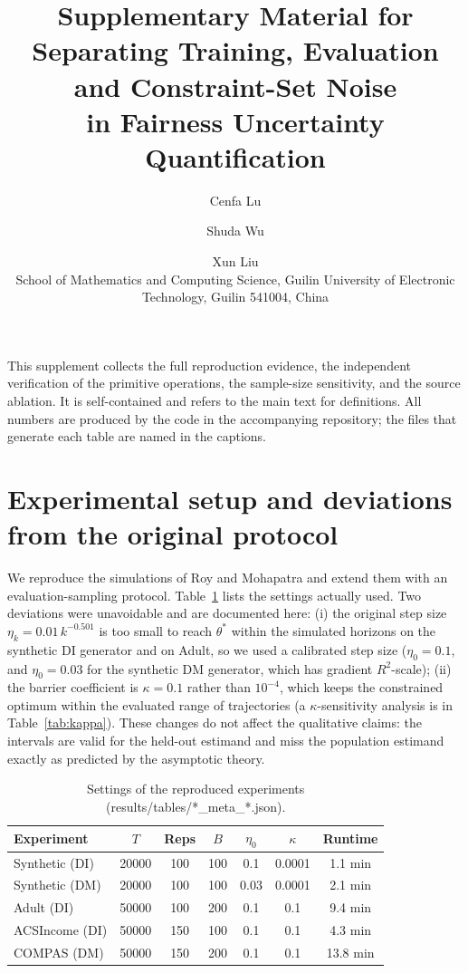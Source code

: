 \documentclass[11pt]{article}
\title{Supplementary Material for\\Separating Training, Evaluation and Constraint-Set Noise\\in Fairness Uncertainty Quantification}
\author{Cenfa Lu \and Shuda Wu \and Xun Liu\\[2pt]
\small School of Mathematics and Computing Science, Guilin University of Electronic Technology, Guilin 541004, China}
\date{}
\begin{document}
\maketitle
\noindent This supplement collects the full reproduction evidence, the independent verification
of the primitive operations, the sample-size sensitivity, and the source ablation.  It is
self-contained and refers to the main text for definitions.  All numbers are produced by the
code in the accompanying repository; the files that generate each table are named in the
captions.

\section{Experimental setup and deviations from the original protocol}

We reproduce the simulations of Roy and Mohapatra \citep{roy2026uq} and extend them with
an evaluation-sampling protocol.  Table~\ref{tab:setup} lists the settings actually used.
Two deviations were unavoidable and are documented here: (i) the original step size
$\eta_k=0.01\,k^{-0.501}$ is too small to reach $\theta^*$ within the simulated horizons on the
synthetic DI generator and on Adult, so we used a calibrated step size ($\eta_0=0.1$, and
$\eta_0=0.03$ for the synthetic DM generator, which has gradient $R^2$-scale);
(ii) the barrier coefficient is $\kappa=0.1$ rather than $10^{-4}$, which keeps the constrained
optimum within the evaluated range of trajectories (a $\kappa$-sensitivity analysis is in
Table~\ref{tab:kappa}).  These changes do not affect the qualitative claims: the intervals are
valid for the held-out estimand and miss the population estimand exactly as predicted by the
asymptotic theory.

\begin{table}[h]
\centering
\small
\caption{Settings of the reproduced experiments (results/tables/*_meta_*.json).}
\label{tab:setup}
\begin{tabular}{lcccccc}
\toprule
Experiment & $T$ & Reps & $B$ & $\eta_0$ & $\kappa$ & Runtime \\
\midrule
Synthetic (DI) & 20000 & 100 & 100 & 0.1 & 0.0001 & 1.1 min \\
Synthetic (DM) & 20000 & 100 & 100 & 0.03 & 0.0001 & 2.1 min \\
Adult (DI) & 50000 & 100 & 200 & 0.1 & 0.1 & 9.4 min \\
ACSIncome (DI) & 50000 & 150 & 100 & 0.1 & 0.1 & 4.3 min \\
COMPAS (DM) & 50000 & 150 & 200 & 0.1 & 0.1 & 13.8 min \\
\bottomrule
\end{tabular}
\end{table}
\end{document}
